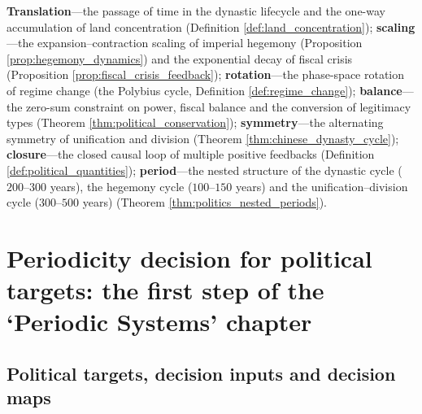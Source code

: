 \begin{remark}\label{rem:politics_seven_themes}
\textbf{Translation}---the passage of time in the dynastic lifecycle and the one-way accumulation of land concentration (Definition \ref{def:land_concentration}); \textbf{scaling}---the expansion--contraction scaling of imperial hegemony (Proposition \ref{prop:hegemony_dynamics}) and the exponential decay of fiscal crisis (Proposition \ref{prop:fiscal_crisis_feedback}); \textbf{rotation}---the phase-space rotation of regime change (the Polybius cycle, Definition \ref{def:regime_change}); \textbf{balance}---the zero-sum constraint on power, fiscal balance and the conversion of legitimacy types (Theorem \ref{thm:political_conservation}); \textbf{symmetry}---the alternating symmetry of unification and division (Theorem \ref{thm:chinese_dynasty_cycle}); \textbf{closure}---the closed causal loop of multiple positive feedbacks (Definition \ref{def:political_quantities}); \textbf{period}---the nested structure of the dynastic cycle ($200$--$300$ years), the hegemony cycle ($100$--$150$ years) and the unification--division cycle ($300$--$500$ years) (Theorem \ref{thm:politics_nested_periods}).
\end{remark}

\section{Periodicity decision for political targets: the first step of the `Periodic Systems' chapter}
\label{sec:politics_periodicity_decision}

\subsection{Political targets, decision inputs and decision maps}

